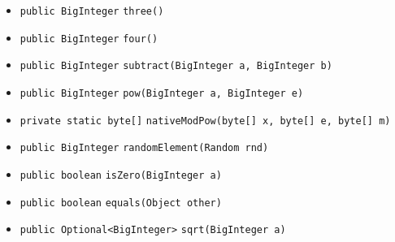 \begin{itemize}
\item \lstinline|public BigInteger| \lstinline|three|\lstinline|()| \\[-0.6em]




\item \lstinline|public BigInteger| \lstinline|four|\lstinline|()| \\[-0.6em]




\item \lstinline|public BigInteger| \lstinline|subtract|\lstinline|(BigInteger a, BigInteger b)| \\[-0.6em]




\item \lstinline|public BigInteger| \lstinline|pow|\lstinline|(BigInteger a, BigInteger e)| \\[-0.6em]




\item \lstinline|private static byte[]| \lstinline|nativeModPow|\lstinline|(byte[] x, byte[] e, byte[] m)| \\[-0.6em]




\item \lstinline|public BigInteger| \lstinline|randomElement|\lstinline|(Random rnd)| \\[-0.6em]




\item \lstinline|public boolean| \lstinline|isZero|\lstinline|(BigInteger a)| \\[-0.6em]




\item \lstinline|public boolean| \lstinline|equals|\lstinline|(Object other)| \\[-0.6em]




\item \lstinline|public Optional<BigInteger>| \lstinline|sqrt|\lstinline|(BigInteger a)| \\[-0.6em]




\end{itemize}

